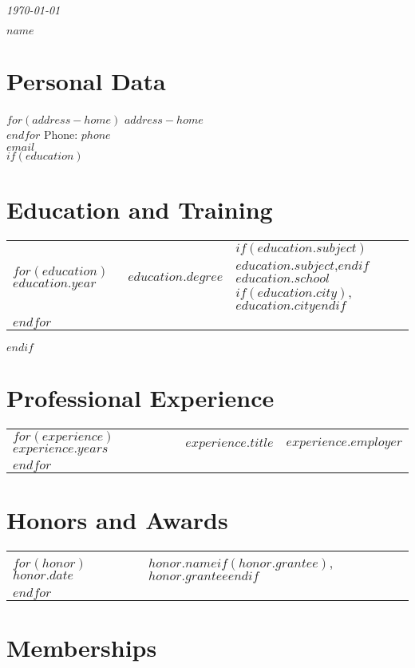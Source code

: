\documentclass[martgin, line]{article}
\begin{document}
\begin{flushright}
  \textit{\today}
\end{flushright}



\begin{LARGE}
  \textbf{$name$}
\end{LARGE}

\section*{Personal Data}

$for(address-home)$
$address-home$\\
$endfor$
Phone: $phone$\\
\href{mailto:$email$}{$email$}\\


$if(education)$
\section*{Education and Training}
\noindent
\begin{tabular}{lll}
$for(education)$
$education.year$&$education.degree$&
$if(education.subject)$$education.subject$,$endif$
$education.school$$if(education.city)$, $education.city$$endif$\\
$endfor$
\end{tabular}
$endif$

\section*{Professional Experience}
\noindent
\begin{tabular}{lll}
$for(experience)$
$experience.years$&
$experience.title$&
$experience.employer$\\
$endfor$
\end{tabular}

\section*{Honors and Awards}
\begin{tabular}{lp{5.5in}}
$for(honor)$
$honor.date$&
$honor.name$$if(honor.grantee)$, $honor.grantee$$endif$
\\
$endfor$
\end{tabular}


\section*{Memberships}
\end{document}
